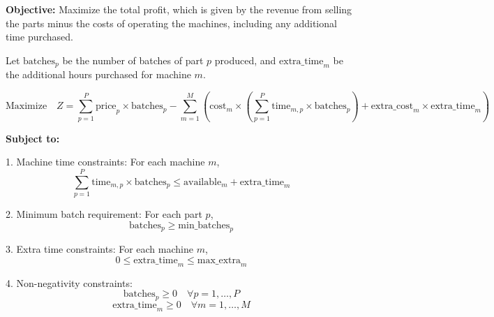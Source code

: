 \documentclass{article}
\begin{document}
\textbf{Objective:}
Maximize the total profit, which is given by the revenue from selling the parts minus the costs of operating the machines, including any additional time purchased.

Let \( \text{batches}_p \) be the number of batches of part \( p \) produced, and \( \text{extra\_time}_m \) be the additional hours purchased for machine \( m \).

\[
\text{Maximize} \quad Z = \sum_{p=1}^{P} \text{price}_p \times \text{batches}_p - \sum_{m=1}^{M} \left( \text{cost}_m \times \left( \sum_{p=1}^{P} \text{time}_{m,p} \times \text{batches}_p \right) + \text{extra\_cost}_m \times \text{extra\_time}_m \right)
\]

\textbf{Subject to:}

1. Machine time constraints: For each machine \( m \),
\[
\sum_{p=1}^{P} \text{time}_{m,p} \times \text{batches}_p \leq \text{available}_m + \text{extra\_time}_m
\]

2. Minimum batch requirement: For each part \( p \),
\[
\text{batches}_p \geq \text{min\_batches}_p
\]

3. Extra time constraints: For each machine \( m \),
\[
0 \leq \text{extra\_time}_m \leq \text{max\_extra}_m
\]

4. Non-negativity constraints:
\[
\text{batches}_p \geq 0 \quad \forall p = 1, \ldots, P
\]
\[
\text{extra\_time}_m \geq 0 \quad \forall m = 1, \ldots, M
\]
\end{document}
